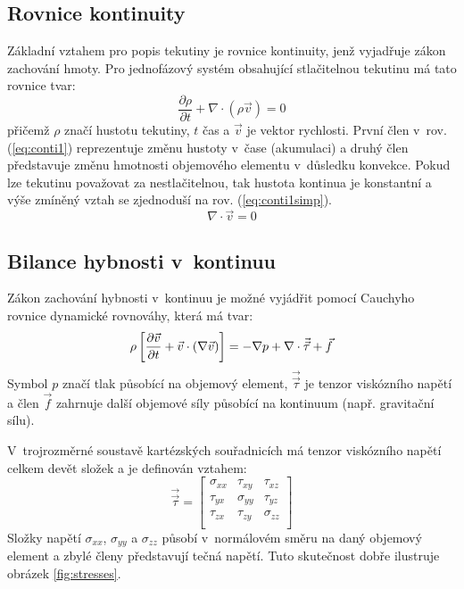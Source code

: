 \subsection{Rovnice kontinuity}

Základní vztahem pro popis tekutiny je rovnice kontinuity, jenž vyjadřuje zákon zachování hmoty. Pro jednofázový systém obsahující stlačitelnou tekutinu má tato rovnice tvar:
\begin{equation}
	\frac{\partial \rho}{\partial t} + \nabla \cdot (\rho\vec{v}) = 0
	\label{eq:conti1}
\end{equation}
přičemž $\rho$ značí hustotu tekutiny, $t$ čas a $\vec{v}$ je vektor rychlosti. První člen v~rov. (\ref{eq:conti1}) reprezentuje změnu hustoty v~čase (akumulaci) a druhý člen představuje změnu hmotnosti objemového elementu v~důsledku konvekce. Pokud lze tekutinu považovat za nestlačitelnou, tak hustota kontinua je konstantní a výše zmíněný vztah se zjednoduší na rov. (\ref{eq:conti1simp}).
\begin{equation}
	\nabla \cdot \vec{v} = 0
	\label{eq:conti1simp}
\end{equation}  

\subsection{Bilance hybnosti v~kontinuu}
Zákon zachování hybnosti v~kontinuu je možné vyjádřit pomocí Cauchyho rovnice dynamické rovnováhy, která má tvar:
\begin{equation}
    \rho \left[ \frac{\partial \vec{v}}{\partial t} + \vec{v} \cdot \left( \nabla \vec{v} \right) \right] = -\nabla p +  \nabla \cdot \vec{\vec{\tau}} + \vec{f}
  	\label{eq:cauchy}
\end{equation} 
Symbol $p$ značí tlak působící na objemový element, $\vec{\vec{\tau}}$ je tenzor viskózního napětí a člen $\vec{f}$ zahrnuje další objemové síly působící na kontinuum (např. gravitační sílu).

V~trojrozměrné soustavě kartézských souřadnicích má tenzor viskózního napětí celkem devět složek a je definován vztahem:
\begin{equation}
    \vec{\vec{\tau}} = 
    \begin{bmatrix}
      \sigma_{xx} & \tau_{xy} & \tau_{xz}\\ 
      \tau_{yx} & \sigma_{yy} & \tau_{yz}\\ 
      \tau_{zx} & \tau_{zy} & \sigma_{zz}\\ 
    \end{bmatrix}
  	\label{eq:tenstress}
\end{equation} 
Složky napětí $\sigma_{xx}$, $\sigma_{yy}$ a $\sigma_{zz}$ působí v~normálovém směru na daný objemový element a zbylé členy představují tečná napětí. Tuto skutečnost dobře ilustruje obrázek \ref{fig:stresses}. 

